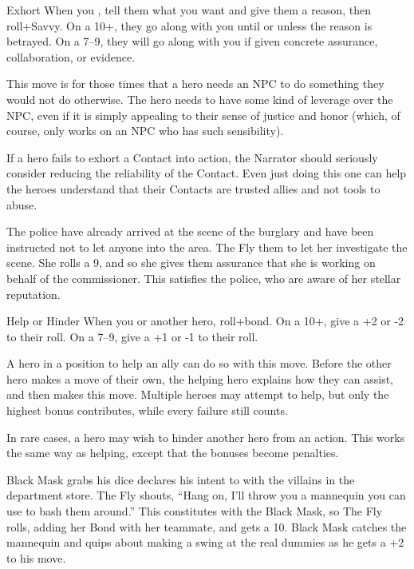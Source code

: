 \begin{movedef}{Exhort}
{
  When you , tell them what
  you want and give them a reason, then roll+Savvy. On a 10+, they
  go along with you until or unless the reason is betrayed. On a
  7--9, they will go along with you if given concrete assurance,
  collaboration, or evidence. \onamiss{}
}
{
  This move is for those times that a hero needs an NPC to do something
  they would not do otherwise. The hero needs to have some kind of
  leverage over the NPC, even if it is simply appealing to their sense
  of justice and honor (which, of course, only works on an NPC who
  has such sensibility).
 
  If a hero fails to exhort a Contact into action, the Narrator should
  seriously consider reducing the reliability of the Contact.  Even
  just doing this one can help the heroes understand that their
  Contacts are trusted allies and not tools to abuse.

  \begin{example}
    The police have already arrived at the scene of the burglary and
    have been instructed not to let anyone into the area.
    The Fly  them to let her investigate the scene.
    She rolls a 9, and so she gives them assurance that she
    is working on behalf of the commissioner. This satisfies the
    police, who are aware of her stellar reputation.
  \end{example}
}
\end{movedef}

\begin{movedef}{Help or Hinder}
  {
    When you  or  another hero, roll+bond. On a 10+, give a +2 or -2 to their roll. On a 7--9, give a +1 or -1 to their roll. \onamiss{}
  }
  {
    A hero in a position to help an ally can do so with this move.
    Before the other hero makes a move of their own, the helping hero
    explains how they can assist, and then makes this move.
    Multiple heroes may attempt to help, but only the highest bonus
    contributes, while every failure still counts.
    
    In rare cases, a hero may wish to hinder another hero from an action.
    This works the same way as helping, except that the bonuses become
    penalties.

    \begin{example}
      Black Mask grabs his dice declares his intent to  with the
      villains in the department store.
      The Fly shouts, ``Hang on, I'll throw you a mannequin you can use
      to bash them around.'' This constitutes  with the Black
      Mask, so The Fly rolls, adding her Bond with her teammate,
      and gets a 10. Black Mask catches the mannequin and quips
      about making a swing at the real dummies as he gets a +2 to
      his  move.
    \end{example}
  }
\end{movedef}
